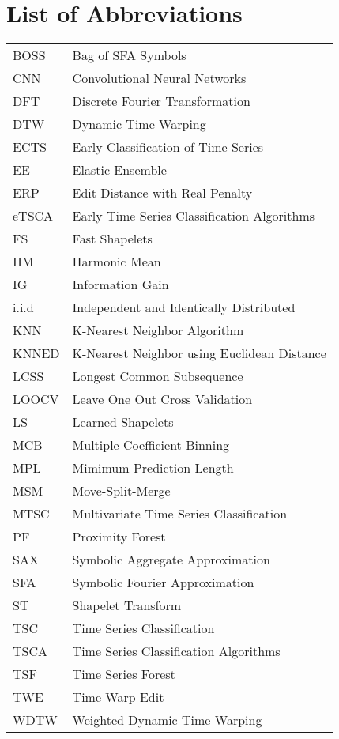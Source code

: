 \section*{List of Abbreviations}


\begin{table}[h!]
\begin{tabular}{ll}
BOSS   & Bag of SFA Symbols\\
CNN   & Convolutional Neural Networks\\
DFT   & Discrete Fourier Transformation\\
DTW   & Dynamic Time Warping\\
ECTS   & Early Classification of Time Series\\
EE   & Elastic Ensemble\\
ERP   & Edit Distance with Real Penalty\\
eTSCA   & Early Time Series Classification Algorithms\\
FS   & Fast Shapelets\\
HM   & Harmonic Mean\\
IG   & Information Gain\\
i.i.d   & Independent and Identically Distributed\\
KNN   & K-Nearest Neighbor Algorithm\\
KNNED   & K-Nearest Neighbor using Euclidean Distance\\
LCSS   & Longest Common Subsequence\\
LOOCV   & Leave One Out Cross Validation\\
LS   & Learned Shapelets\\
MCB   & Multiple Coefficient Binning\\
MPL   & Mimimum Prediction Length\\
MSM   & Move-Split-Merge\\
MTSC   & Multivariate Time Series Classification\\
PF   & Proximity Forest\\
SAX   & Symbolic Aggregate Approximation\\
SFA   & Symbolic Fourier Approximation\\
ST   & Shapelet Transform\\
TSC   & Time Series Classification\\
TSCA   & Time Series Classification Algorithms\\
TSF   & Time Series Forest\\
TWE   & Time Warp Edit\\
WDTW   & Weighted Dynamic Time Warping
\end{tabular}
\end{table}

\null\newpage
